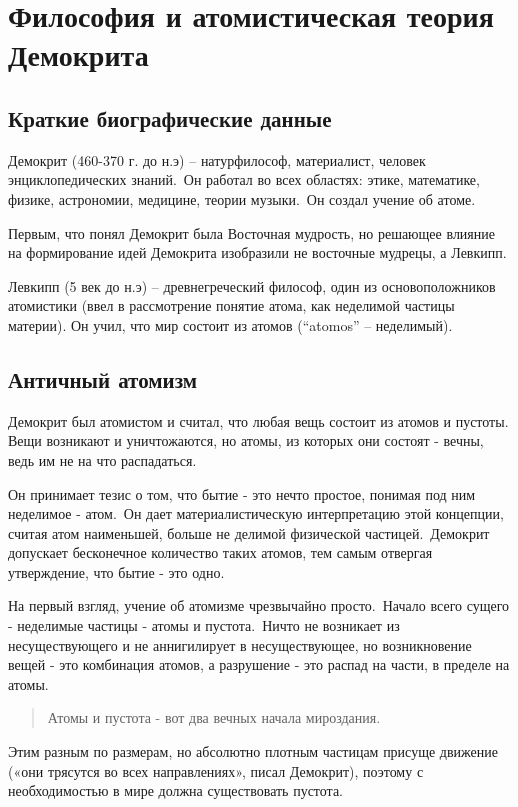 \documentclass[a4paper, 14pt]{extreport}
\begin{document}
\section{Философия и атомистическая теория Демокрита}

\subsection{Краткие биографические данные}

Демокрит (460-370 г. до н.э) -- натурфилософ, материалист, человек
энциклопедических знаний.~Он работал во всех областях: этике,
математике, физике, астрономии, медицине, теории музыки.~Он создал
учение об атоме.~

Первым, что понял Демокрит была Восточная мудрость, но решающее влияние
на формирование идей Демокрита изобразили не восточные мудрецы, а
Левкипп.

Левкипп (5 век до н.э) -- древнегреческий философ, один из
основоположников атомистики (ввел в рассмотрение понятие атома, как
неделимой частицы материи). Он учил, что мир состоит из атомов
(``atomos'' -- неделимый).

\subsection{Античный атомизм}

Демокрит был атомистом и считал, что любая вещь состоит из атомов и
пустоты. Вещи возникают и уничтожаются, но атомы, из которых они состоят
- вечны, ведь им не на что распадаться.

Он принимает тезис о том, что бытие - это нечто простое, понимая под ним
неделимое - атом.~Он дает материалистическую интерпретацию этой
концепции, считая атом наименьшей, больше не делимой физической
частицей.~Демокрит допускает бесконечное количество таких атомов, тем
самым отвергая утверждение, что бытие - это одно.~

На первый взгляд, учение об атомизме чрезвычайно просто.~Начало всего
сущего - неделимые частицы - атомы и пустота.~Ничто не возникает из
несуществующего и не аннигилирует в несуществующее, но возникновение
вещей - это комбинация атомов, а разрушение - это распад на части, в
пределе на атомы.~

\begin{quote}
Атомы и пустота - вот два вечных начала мироздания.
\end{quote}

Этим разным по размерам, но абсолютно плотным частицам присуще движение
(«они трясутся во всех направлениях», писал Демокрит), поэтому с
необходимостью в мире должна существовать пустота.
\end{document}
